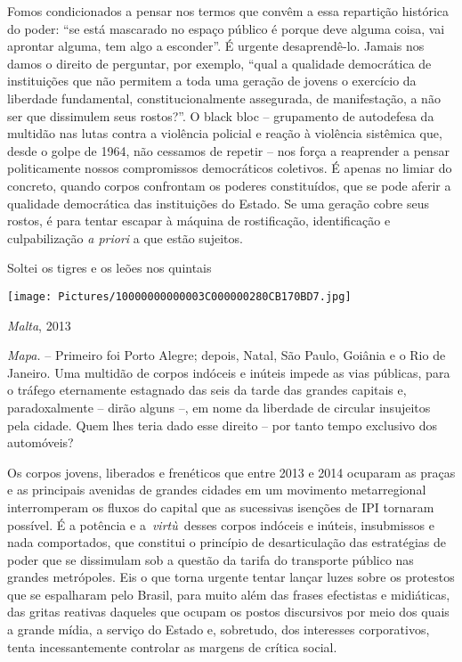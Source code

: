 Fomos condicionados a pensar nos termos que convêm a essa repartição
histórica do poder: ``se está mascarado no espaço público é porque deve
alguma coisa, vai aprontar alguma, tem algo a esconder''. É urgente
desaprendê-lo. Jamais nos damos o direito de perguntar, por exemplo,
``qual a qualidade democrática de instituições que não permitem a toda
uma geração de jovens o exercício da liberdade fundamental,
constitucionalmente assegurada, de manifestação, a não ser que
dissimulem seus rostos?''. O black bloc -- grupamento de autodefesa da
multidão nas lutas contra a violência policial e reação à violência
sistêmica que, desde o golpe de 1964, não cessamos de repetir -- nos
força a reaprender a pensar politicamente nossos compromissos
democráticos coletivos. É apenas no limiar do concreto, quando corpos
confrontam os poderes constituídos, que se pode aferir a qualidade
democrática das instituições do Estado. Se uma geração cobre seus
rostos, é para tentar escapar à máquina de rostificação, identificação e
culpabilização \emph{a priori} a que estão sujeitos.

Soltei os tigres e os leões nos quintais

\texttt{[image: Pictures/10000000000003C000000280CB170BD7.jpg]}

\emph{Malta}, 2013

\emph{Mapa.} --\emph{ }Primeiro foi Porto Alegre; depois, Natal, São
Paulo, Goiânia e o Rio de Janeiro. Uma multidão de corpos indóceis e
inúteis impede as vias públicas, para o tráfego eternamente estagnado
das seis da tarde das grandes capitais e, paradoxalmente -- dirão alguns
--, em nome da liberdade de circular insujeitos pela cidade. Quem lhes
teria dado esse direito -- por tanto tempo exclusivo dos automóveis?

Os corpos jovens, liberados e frenéticos que entre 2013 e 2014 ocuparam
as praças e as principais avenidas de grandes cidades em um movimento
metarregional interromperam os fluxos do capital que as sucessivas
isenções de IPI tornaram possível. É a potência e a~\emph{virtù~}desses
corpos indóceis e inúteis, insubmissos e nada comportados, que constitui
o princípio de desarticulação das estratégias de poder que se dissimulam
sob a questão da tarifa do transporte público nas grandes metrópoles.
Eis o que torna urgente tentar lançar luzes sobre os protestos que se
espalharam pelo Brasil, para muito além das frases efectistas e
midiáticas, das gritas reativas daqueles que ocupam os postos
discursivos por meio dos quais a grande mídia, a serviço do Estado e,
sobretudo, dos interesses corporativos, tenta incessantemente controlar
as margens de crítica social.

